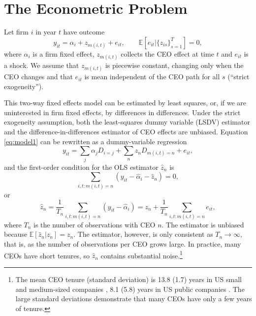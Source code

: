 \documentclass[11pt,a4paper]{article}
\begin{document}

\section{The Econometric Problem}

Let firm $i$ in year $t$ have outcome
\begin{equation}\label{eq:model1}
  y_{it} = \alpha_i + z_{m(i,t)} + e_{it},\qquad \mathbb E[e_{it}|\{z_{is}\}_{s=1}^T]=0,
\end{equation}
where $\alpha_i$ is a firm fixed effect, $z_{m(i,t)}$ collects the CEO effect at time $t$ and $e_{it}$ is a shock. We assume that $z_{m(i,t)}$ is piecewise constant, changing only when the CEO changes and that $e_{it}$ is mean independent of the CEO path for all $s$ (``strict exogeneity'').

This two-way fixed effects model can be estimated by least squares, or, if we are uninterested in firm fixed effects, by differences in differences. Under the strict exogeneity assumption, both the least-squares dummy variable (LSDV) estimator and the difference-in-differences estimator of CEO effects are unbiased. Equation \eqref{eq:model1} can be rewritten as a dummy-variable regression 
$$
y_{it} = \sum_{j}\alpha_j D_{i=j} + \sum_{n} z_n D_{m(i,t)=n}  + e_{it},
$$
and the first-order condition for the OLS estimator $\hat z_n$ is
$$
\sum_{i,t:m(i,t)=n} (y_{it} - \hat\alpha_i - \hat z_n) =0,
$$
or 
$$
\hat z_n = \frac{1}{T_n} \sum_{i,t:m(i,t)=n} (y_{it} - \hat\alpha_i) = z_n + \frac{1}{T_n} \sum_{i,t:m(i,t)=n} e_{it},
$$
where $T_n$ is the number of observations with CEO $n$. The estimator is unbiased because $\mathbb E[\hat z_n|z_n] = z_n$. The estimator, however, is only consistent as $T_n\to\infty$, that is, as the number of observations per CEO grows large. In practice, many CEOs have short tenures, so $\hat z_n$ contains substantial noise.\footnote{The mean CEO tenure (standard deviation) is 13.8 (1.7) years in US small and medium-sized companies \citep{simsek2007ceo}, 8.1 (5.8) years in US public companies \citep{brookman2009ceo}. The large standard deviations demonstrate that many CEOs have only a few years of tenure.} 
\end{document}
